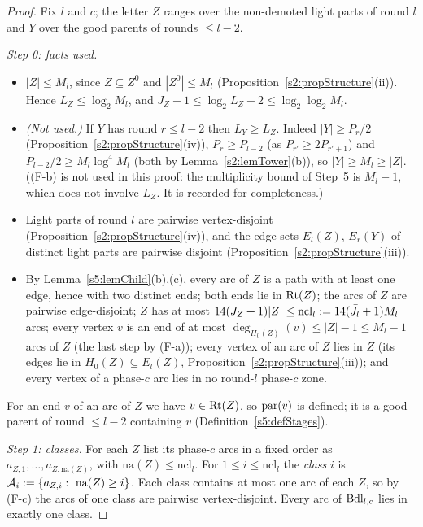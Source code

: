 \begin{proof}
Fix $l$ and $c$; the letter $Z$ ranges over the non-demoted light parts of round $l$ and $Y$ over the good parents of rounds $\le l-2$.

\emph{Step 0: facts used.}
\begin{itemize}
\item[(F-a)] $|Z|\le M_l$, since $Z\subseteq Z^0$ and $|Z^0|\le M_l$ (Proposition~\ref{s2:propStructure}(ii)). Hence $L_Z\le\log_2M_l$, and $J_Z+1\le\log_2L_Z-2\le\log_2\log_2M_l$.
\item[(F-b)] \emph{(Not used.)} If $Y$ has round $r\le l-2$ then $L_Y\ge L_Z$. Indeed $|Y|\ge P_r/2$ (Proposition~\ref{s2:propStructure}(iv)), $P_r\ge P_{l-2}$ (as $P_{r'}\ge2P_{r'+1}$) and $P_{l-2}/2\ge M_l\log^4M_l$ (both by Lemma~\ref{s2:lemTower}(b)), so $|Y|\ge M_l\ge|Z|$. ((F-b) is not used in this proof: the multiplicity bound of Step~5 is $M_l-1$, which does not involve $L_Z$. It is recorded for completeness.)
\item[(F-c)] Light parts of round $l$ are pairwise vertex-disjoint (Proposition~\ref{s2:propStructure}(iv)), and the edge sets $E_l(Z)$, $E_r(Y)$ of distinct light parts are pairwise disjoint (Proposition~\ref{s2:propStructure}(iii)).
\item[(F-d)] By Lemma~\ref{s5:lemChild}(b),(c), every arc of $Z$ is a path with at least one edge, hence with two distinct ends; both ends lie in $\mathrm{Rt}(Z)$; the arcs of $Z$ are pairwise edge-disjoint; $Z$ has at most $14(J_Z+1)|Z|\le \mathrm{ncl}_l\mathrel{:=}14(\bar J_l+1)M_l$ arcs; every vertex $v$ is an end of at most $\deg_{H_0(Z)}(v)\le|Z|-1\le M_l-1$ arcs of $Z$ (the last step by (F-a)); every vertex of an arc of $Z$ lies in $Z$ (its edges lie in $H_0(Z)\subseteq E_l(Z)$, Proposition~\ref{s2:propStructure}(iii)); and every vertex of a phase-$c$ arc lies in no round-$l$ phase-$c$ zone.
\end{itemize}
For an end $v$ of an arc of $Z$ we have $v\in\mathrm{Rt}(Z)$, so $\mathrm{par}(v)$ is defined; it is a good parent of round $\le l-2$ containing $v$ (Definition~\ref{s5:defStages}).

\emph{Step 1: classes.} For each $Z$ list its phase-$c$ arcs in a fixed order as $a_{Z,1},\dots,a_{Z,\mathrm{na}(Z)}$, with $\mathrm{na}(Z)\le \mathrm{ncl}_l$. For $1\le i\le \mathrm{ncl}_l$ the \emph{class} $i$ is $\mathcal A_i\defeq\{a_{Z,i}:\ \mathrm{na}(Z)\ge i\}$. Each class contains at most one arc of each $Z$, so by (F-c) the arcs of one class are pairwise vertex-disjoint. Every arc of $\mathrm{Bdl}_{l,c}$ lies in exactly one class.


\end{proof}
